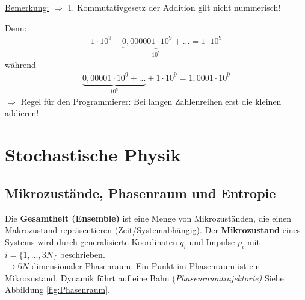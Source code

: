 \documentclass[12pt]{article}
\begin{document}
\begin{enumerate}
\begin{enumerate}
\underline{Bemerkung:} $\Rightarrow $ 1. Kommutativgesetz der Addition gilt nicht nummerisch! 

Denn:
\begin{align*}
1 \cdot 10^9 + \underbrace{ 0,000001 \cdot 10^9 + ... }_{10^{5}} = 1 \cdot 10^9
\end{align*}
während
\begin{align*}
\underbrace{0,00001 \cdot 10^9 + ... }_{10^5} + 1 \cdot 10^9 = 1,0001 \cdot 10^9
\end{align*}
$\Rightarrow$ Regel für den Programmierer: Bei langen Zahlenreihen erst die kleinen addieren! 
\end{enumerate}
\end{enumerate}

\section{Stochastische Physik}

\subsection{Mikrozustände, Phasenraum und Entropie}
Die \textbf{Gesamtheit (Ensemble)} ist eine Menge von Mikrozuständen, die einen Makrozustand repräsentieren (Zeit/Systemabhängig). Der \textbf{Mikrozustand} eines Systems wird durch generalisierte Koordinaten $q_i$ und Impulse $p_i$ mit $i=\{ 1,...,3N\} $ beschrieben. \\
$\to 6N$-dimensionaler Phasenraum. Ein Punkt im Phasenraum ist ein Mikrozustand, Dynamik führt auf eine Bahn (\textit{Phasenraumtrajektorie)} Siehe Abbildung \ref{fig:Phasenraum}.
\end{document}
